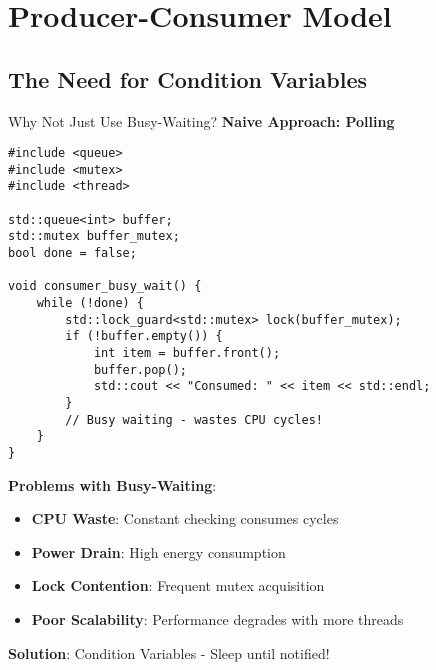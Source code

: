 \section{Producer-Consumer Model}

\subsection{The Need for Condition Variables}
\begin{frame}[fragile]{ Why Not Just Use Busy-Waiting?}
	\textbf{Naive Approach: Polling}
	\begin{verbatim}
#include <queue>
#include <mutex>
#include <thread>

std::queue<int> buffer;
std::mutex buffer_mutex;
bool done = false;

void consumer_busy_wait() {
    while (!done) {
        std::lock_guard<std::mutex> lock(buffer_mutex);
        if (!buffer.empty()) {
            int item = buffer.front();
            buffer.pop();
            std::cout << "Consumed: " << item << std::endl;
        }
        // Busy waiting - wastes CPU cycles!
    }
}
	\end{verbatim}

	\vspace{0.5em}
	\textbf{Problems with Busy-Waiting}:
	\begin{itemize}
		\item {} \textbf{CPU Waste}: Constant checking consumes cycles
		\item {} \textbf{Power Drain}: High energy consumption
		\item {} \textbf{Lock Contention}: Frequent mutex acquisition
		\item {} \textbf{Poor Scalability}: Performance degrades with more threads
	\end{itemize}

	\vspace{0.5em}
	 \textbf{Solution}: Condition Variables - Sleep until notified!
\end{frame}

